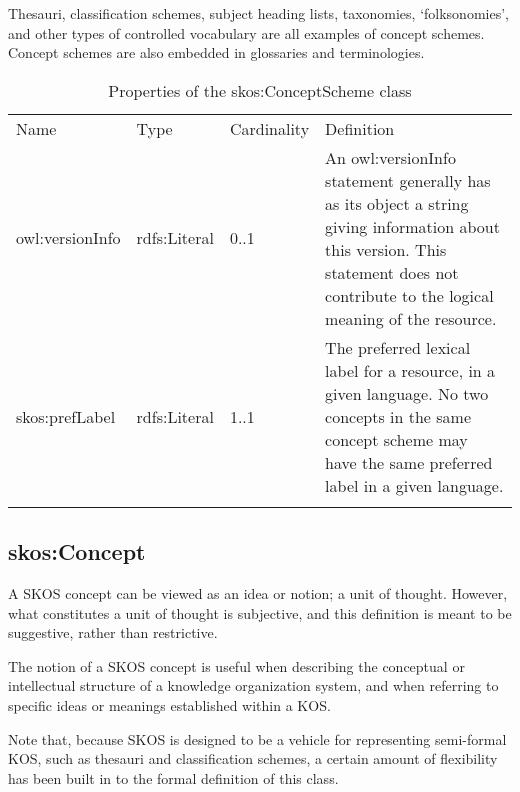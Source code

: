 Thesauri, classification schemes, subject heading lists, taxonomies,
`folksonomies', and other types of controlled vocabulary are all
examples of concept schemes. Concept schemes are also embedded in
glossaries and terminologies.

{
	\footnotesize
	\selectfont%
	\begin{longtable}[c]{@{}p{3cm}p{2cm}p{2cm}p{7.8cm}@{}}
		\toprule\addlinespace
		Name & Type & Cardinality & Definition
		\\\addlinespace
		\midrule\endhead
		owl:versionInfo & rdfs:Literal & 0..1 & An owl:versionInfo statement
		generally has as its object a string giving information about this
		version. This statement does not contribute to the logical meaning of
		the resource.
		\\\addlinespace
		skos:prefLabel & rdfs:Literal & 1..1 & The preferred lexical label for a
		resource, in a given language. No two concepts in the same concept
		scheme may have the same preferred label in a given language.
		\\\addlinespace
		\bottomrule
		\addlinespace
		\caption{Properties of the skos:ConceptScheme class}
	\end{longtable}
}

\subsection{skos:Concept}

A SKOS concept can be viewed as an idea or notion; a unit of thought.
However, what constitutes a unit of thought is subjective, and this
definition is meant to be suggestive, rather than restrictive.

The notion of a SKOS concept is useful when describing the conceptual or
intellectual structure of a knowledge organization system, and when
referring to specific ideas or meanings established within a KOS.

Note that, because SKOS is designed to be a vehicle for representing
semi-formal KOS, such as thesauri and classification schemes, a certain
amount of flexibility has been built in to the formal definition of this
class.

